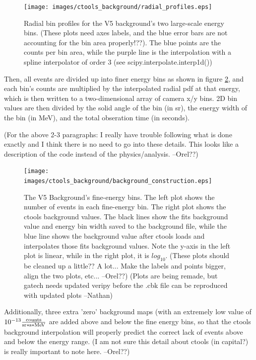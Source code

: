     \begin{figure}[ht]
      \centering
      \texttt{[image: images/ctools\_background/radial\_profiles.eps]}
      \caption[CTOOLS Radial Background Profiles]{
        Radial bin profiles for the V5 background's two large-scale energy bins.
        (These plots need axes labels, and the blue error bars are not accounting for the bin area properly!??).
        The blue points are the counts per bin area, while the purple line is the interpolation with a spline interpolator of order 3 (see scipy.interpolate.interp1d())
        }
      \label{fig:background_radial}
    \end{figure}


    Then, all events are divided up into  finer energy bins as shown in figure \ref{fig:background_profile}, and each bin's counts are multiplied by the interpolated radial pdf at that energy, which is then written to a two-dimensional array of camera x/y bins.
    2D bin values are then divided by the solid angle of the bin (in sr), the energy width of the bin (in MeV), and the total obseration time (in seconds).

    (For the above 2-3 paragraphs: I really have trouble following what is done exactly and I think there is no need to go into these details. This looks like a description of the code instead of the physics/analysis. --Orel??)

    \begin{figure}[ht]
      \centering
      \texttt{[image: images/ctools\_background/background\_construction.eps]}
      \caption[CTOOLS Background Fine Energy Bins]{
        The V5 Background's fine-energy bins.
        The left plot shows the number of events in each fine-energy bin.
        The right plot shows the ctools background values.
        The black lines show the fits background value and energy bin width saved to the background file, while the blue line shows the background value after ctools loads and interpolates those fits background values.
        Note the y-axis in the left plot is linear, while in the right plot, it is $log_{10}$.
        (These plots should be cleaned up a little??  A lot... Make the labels and points bigger, align the two plots, etc... --Orel??)
        (Plots are being remade, but gatech needs updated veripy before the .cbk file can be reproduced with updated plots --Nathan)
      }
      \label{fig:background_profile}
    \end{figure}

    Additionally, three extra 'zero' background maps (with an extremely low value of $10^{-13} \frac{\text{counts}}{\text{sr}*\text{s}*\MeV}$ are added above and below the fine energy bins, so that the ctools background interpolation will properly predict the correct lack of events above and below the energy range.
    (I am not sure this detail about ctools (in capital?) is really important to note here. --Orel??)

